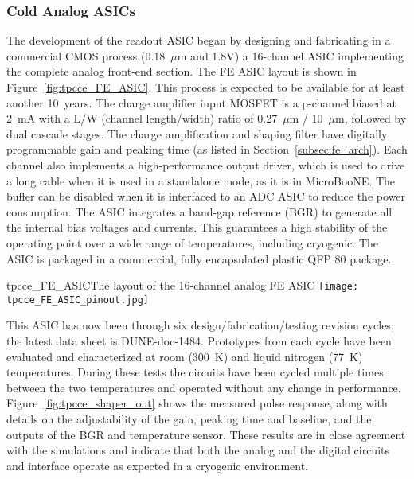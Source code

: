 %
\subsubsection{Cold Analog ASICs}
\label{subsubsec:fe_CMOS_analog}

The development of the readout ASIC began by designing and fabricating in a commercial CMOS
process (0.18~$\mu$m and 1.8V) a 16-channel ASIC implementing the complete analog front-end section.
The FE ASIC layout is shown in Figure~\ref{fig:tpcce_FE_ASIC}.
This process is expected to be available for at least another 10~years. 
The charge amplifier input MOSFET is a p-channel biased at 2~mA with a L/W (channel length/width) ratio
of 0.27~$\mu$m / 10~$\mu$m, followed by dual cascade stages.
The charge amplification and shaping filter have digitally programmable gain and peaking time
(as listed in Section~\ref{subsec:fe_arch}).
Each channel also implements a high-performance output driver,
which is used to drive a long cable when it is used in a standalone mode, as it is in MicroBooNE.\cite{noise_filter}
The buffer can be disabled when it is interfaced to an ADC ASIC to reduce the power consumption.
The ASIC integrates a band-gap reference (BGR) to generate all the internal bias voltages and currents.
This guarantees a high stability of the operating point over a wide range of
temperatures, including cryogenic.
The ASIC is packaged in a commercial, fully encapsulated plastic QFP 80 package.

\begin{cdrfigure}{tpcce_FE_ASIC}{The layout of the 16-channel analog FE ASIC}
\texttt{[image: tpcce\_FE\_ASIC\_pinout.jpg]}
\end{cdrfigure}

This ASIC has now been through six design/fabrication/testing revision cycles; the latest data sheet is DUNE-doc-1484.
Prototypes from each cycle have been evaluated and characterized at room (300~K) and liquid nitrogen (77~K) temperatures.
During these tests the circuits have been cycled multiple times
between the two temperatures and operated without any change in performance.
Figure~\ref{fig:tpcce_shaper_out} shows the measured pulse response, along with
details on the adjustability of the gain, peaking time and baseline,
and the outputs of the BGR and temperature sensor.
These results are in close agreement with the simulations and indicate
that both the analog and the digital circuits and interface operate as
expected in a cryogenic environment.

